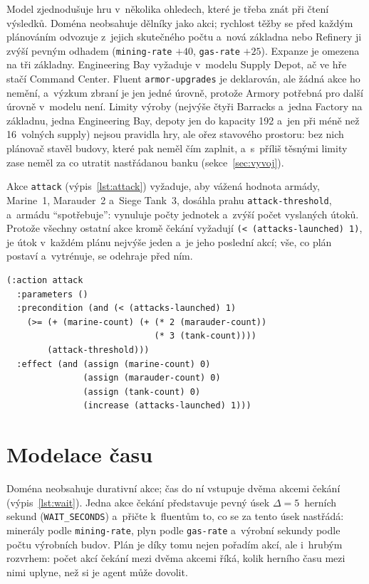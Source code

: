 Model zjednodušuje hru v~několika ohledech, které je třeba znát při čtení výsledků. Doména neobsahuje dělníky jako akci; rychlost těžby se před každým plánováním odvozuje z~jejich skutečného počtu a~nová základna nebo Refinery ji zvýší pevným odhadem (\texttt{mining-rate} $+40$, \texttt{gas-rate} $+25$). Expanze je omezena na tři základny. Engineering Bay vyžaduje v~modelu Supply Depot, ač ve hře stačí Command Center. Fluent \texttt{armor-upgrades} je deklarován, ale žádná akce ho nemění, a~výzkum zbraní je jen jedné úrovně, protože Armory potřebná pro další úrovně v~modelu není. Limity výroby (nejvýše čtyři Barracks a~jedna Factory na základnu, jedna Engineering Bay, depoty jen do kapacity 192 a~jen při méně než 16~volných supply) nejsou pravidla hry, ale ořez stavového prostoru: bez nich plánovač stavěl budovy, které pak neměl čím zaplnit, a~s~příliš těsnými limity zase neměl za co utratit nastřádanou banku (sekce~\ref{sec:vyvoj}).

Akce \texttt{attack} (výpis~\ref{lst:attack}) vyžaduje, aby vážená hodnota armády, Marine~1, Marauder~2 a~Siege Tank~3, dosáhla prahu \texttt{attack-threshold}, a~armádu \enquote{spotřebuje}: vynuluje počty jednotek a~zvýší počet vyslaných útoků. Protože všechny ostatní akce kromě čekání vyžadují \texttt{(< (attacks-launched) 1)}, je útok v~každém plánu nejvýše jeden a~je jeho poslední akcí; vše, co plán postaví a~vytrénuje, se odehraje před ním.

\begin{lstlisting}[caption={Akce útoku v~doméně v11.},label=lst:attack,float,basicstyle=\ttfamily\small]
(:action attack
  :parameters ()
  :precondition (and (< (attacks-launched) 1)
    (>= (+ (marine-count) (+ (* 2 (marauder-count))
                             (* 3 (tank-count))))
        (attack-threshold)))
  :effect (and (assign (marine-count) 0)
               (assign (marauder-count) 0)
               (assign (tank-count) 0)
               (increase (attacks-launched) 1)))
\end{lstlisting}

\section{Modelace času}
\label{sec:cas}

Doména neobsahuje durativní akce; čas do ní vstupuje dvěma akcemi čekání (výpis~\ref{lst:wait}). Jedna akce čekání představuje pevný úsek $\Delta = 5$~herních sekund (\texttt{WAIT\_SECONDS}) a~přičte k~fluentům to, co se za tento úsek nastřádá: minerály podle \texttt{mining-rate}, plyn podle \texttt{gas-rate} a~výrobní sekundy podle počtu výrobních budov. Plán je díky tomu nejen pořadím akcí, ale i~hrubým rozvrhem: počet akcí čekání mezi dvěma akcemi říká, kolik herního času mezi nimi uplyne, než si je agent může dovolit.

